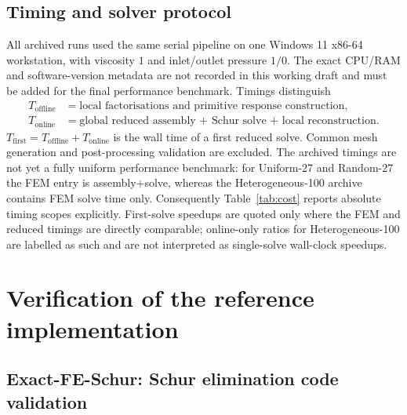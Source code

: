 \documentclass[11pt,a4paper]{article}
\begin{document}
\subsection{Timing and solver protocol}
\label{sec:timing}

All archived runs used the same serial pipeline on one Windows 11
x86-64 workstation, with viscosity $1$ and inlet/outlet pressure $1/0$.
The exact CPU/RAM and software-version metadata are not recorded in this
working draft and must be added for the final performance benchmark.  Timings distinguish
\begin{align}
  T_{\mathrm{offline}} &= \text{local factorisations and primitive
    response construction},\\
  T_{\mathrm{online}} &= \text{global reduced assembly + Schur solve +
    local reconstruction}.
\end{align}
$T_{\mathrm{first}} = T_{\mathrm{offline}} + T_{\mathrm{online}}$ is the
wall time of a first reduced solve.  Common mesh generation and
post-processing validation are excluded.  The archived timings are not
yet a fully uniform performance benchmark: for Uniform-27 and Random-27
the FEM entry is assembly+solve, whereas the Heterogeneous-100 archive
contains FEM solve time only.  Consequently Table~\ref{tab:cost} reports
absolute timing scopes explicitly.  First-solve speedups are quoted only
where the FEM and reduced timings are directly comparable; online-only
ratios for Heterogeneous-100 are labelled as such and are not interpreted
as single-solve wall-clock speedups.

\section{Verification of the reference implementation}
\label{sec:verification}

\subsection{Exact-FE-Schur: Schur elimination code validation}
\label{sec:exactschur}
\end{document}

